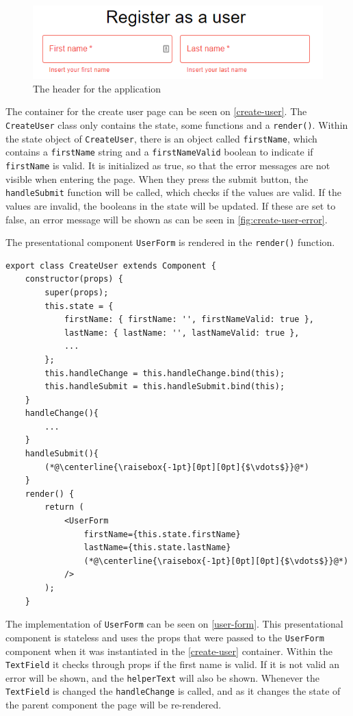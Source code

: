 \begin{figure}[H]
    \includegraphics[width=\linewidth]{figures/create-user-error.png}
    \caption{The header for the application}
    \label{fig:create-user-error}
\end{figure}

The container for the create user page can be seen on \autoref{create-user}.
The \texttt{CreateUser} class only contains the state, some functions and a \texttt{render()}.
Within the state object of \texttt{CreateUser}, there is an object called \texttt{firstName}, which contains a \texttt{firstName} string and a \texttt{firstNameValid} boolean to indicate if \texttt{firstName} is valid.
It is initialized as true, so that the error messages are not visible when entering the page.
When they press the submit button, the \texttt{handleSubmit} function will be called, which checks if the values are valid.
If the values are invalid, the booleans in the state will be updated. 
If these are set to false, an error message will be shown as can be seen in \autoref{fig:create-user-error}.

The presentational component \texttt{UserForm} is rendered in the \texttt{render()} function. 
\begin{lstlisting}[caption={Component to create user}, captionpos=b, label={create-user}]
export class CreateUser extends Component {
    constructor(props) {
        super(props);
        this.state = {
            firstName: { firstName: '', firstNameValid: true },
            lastName: { lastName: '', lastNameValid: true },
            ...
        };
        this.handleChange = this.handleChange.bind(this);
        this.handleSubmit = this.handleSubmit.bind(this);
    }
    handleChange(){
        ...
    }
    handleSubmit(){
        (*@\centerline{\raisebox{-1pt}[0pt][0pt]{$\vdots$}}@*)
    }
    render() {
        return (
            <UserForm
                firstName={this.state.firstName}
                lastName={this.state.lastName}
                (*@\centerline{\raisebox{-1pt}[0pt][0pt]{$\vdots$}}@*)
            />
        );
    }
\end{lstlisting}

The implementation of \texttt{UserForm} can be seen on \autoref{user-form}.
This presentational component is stateless and uses the props that were passed to the \texttt{UserForm} component when it was instantiated in the \autoref{create-user} container.
Within the \texttt{TextField} it checks through props if the first name is valid. 
If it is not valid an error will be shown, and the \texttt{helperText} will also be shown.
Whenever the \texttt{TextField} is changed the \texttt{handleChange} is called, and as it changes the state of the parent component the page will be re-rendered.


